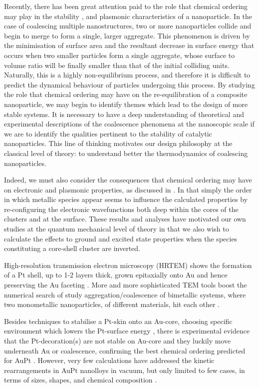 Recently, there has been great attention paid to the role that chemical ordering may play in the stability \cite{Coal2}, and plasmonic characteristics of a nanoparticle. In the case of coalescing multiple nanostructures, two or more nanoparticles collide and begin to merge to form a single, larger aggregate. This phenomenon is driven by the minimisation of surface area and the resultant decrease in surface energy that occurs when two smaller particles form a single aggregate, whose surface to volume ratio will be finally smaller than that of the initial colliding units. Naturally, this is a highly non-equilibrium process, and therefore it is difficult to predict the dynamical behaviour of particles undergoing this process. By studying the role that chemical ordering may have on the re-equilibration of a composite nanoparticle, we may begin to identify themes which lead to the design of more stable systems. It is necessary to have a deep understanding of theoretical and experimental descriptions of the coalescence phenomena at the nanoscopic scale if we are to identify the qualities pertinent to the stability of catalytic nanoparticles. This line of thinking motivates our design philosophy at the classical level of theory: to understand better the thermodynamics of coalescing nanoparticles. 

Indeed, we must also consider the consequences that chemical ordering may have on electronic and plasmonic properties, as discussed in \cite{Ranno2018}. In that simply the order in which metallic species appear seems to influence the calculated properties by re-configuring the electronic wavefunctions both deep within the cores of the clusters and at the surface. These results and analyses have motivated our own studies at the quantum mechanical level of theory in that we also wish to calculate the effects to ground and excited state properties when the species constituting a core-shell cluster are inverted. 

High-resolution transmission electron microscopy (HRTEM) shows the formation of a Pt shell, up to 1-2 layers thick, grown epitaxially onto Au and hence preserving the Au faceting \cite{Aidan2017}.
More and more sophisticated TEM tools boost the numerical search of study aggregation/coalescence of bimetallic systems, where two monometallic nanoparticles, of different materials, hit each other \cite{Nelli2021}.

Besides techniques to stabilise a Pt-skin onto an Au-core, choosing specific environment which lowers the Pt-surface energy \cite{Bian2015}, there is experimental evidence that the Pt-decoration(s) are not stable on Au-core and they luckily move underneath Au or coalescence, confirming the best chemical ordering predicted for AuPt \cite{Hong2019, Guo2020}. However, very few calculations have addressed the kinetic rearrangements in AuPt nanolloys in vacuum, but only limited to few cases, in terms of sizes, shapes, and chemical composition \cite{Jagannath2018,Chen2021}.

